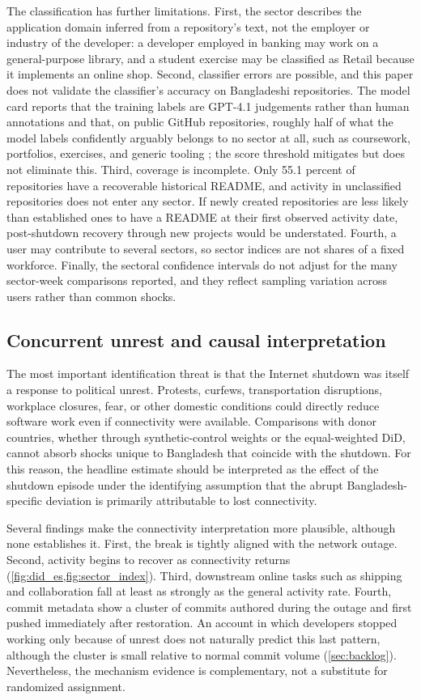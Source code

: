 The classification has further limitations. First, the sector describes the application domain inferred from a repository's text, not the employer or industry of the developer: a developer employed in banking may work on a general-purpose library, and a student exercise may be classified as Retail because it implements an online shop. Second, classifier errors are possible, and this paper does not validate the classifier's accuracy on Bangladeshi repositories. The model card reports that the training labels are GPT-4.1 judgements rather than human annotations and that, on public GitHub repositories, roughly half of what the model labels confidently arguably belongs to no sector at all, such as coursework, portfolios, exercises, and generic tooling \citep{quispe2026naics}; the score threshold mitigates but does not eliminate this. Third, coverage is incomplete. Only 55.1 percent of repositories have a recoverable historical README, and activity in unclassified repositories does not enter any sector. If newly created repositories are less likely than established ones to have a README at their first observed activity date, post-shutdown recovery through new projects would be understated. Fourth, a user may contribute to several sectors, so sector indices are not shares of a fixed workforce. Finally, the sectoral confidence intervals do not adjust for the many sector-week comparisons reported, and they reflect sampling variation across users rather than common shocks.

\subsection{Concurrent unrest and causal interpretation}
\label{sec:unrest}

The most important identification threat is that the Internet shutdown was itself a response to political unrest. Protests, curfews, transportation disruptions, workplace closures, fear, or other domestic conditions could directly reduce software work even if connectivity were available. Comparisons with donor countries, whether through synthetic-control weights or the equal-weighted DiD, cannot absorb shocks unique to Bangladesh that coincide with the shutdown. For this reason, the headline estimate should be interpreted as the effect of the shutdown episode under the identifying assumption that the abrupt Bangladesh-specific deviation is primarily attributable to lost connectivity.

Several findings make the connectivity interpretation more plausible, although none establishes it. First, the break is tightly aligned with the network outage. Second, activity begins to recover as connectivity returns (\cref{fig:did_es,fig:sector_index}). Third, downstream online tasks such as shipping and collaboration fall at least as strongly as the general activity rate. Fourth, commit metadata show a cluster of commits authored during the outage and first pushed immediately after restoration. An account in which developers stopped working only because of unrest does not naturally predict this last pattern, although the cluster is small relative to normal commit volume (\cref{sec:backlog}). Nevertheless, the mechanism evidence is complementary, not a substitute for randomized assignment.


